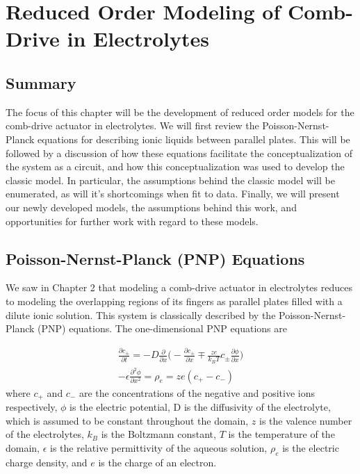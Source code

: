 \chapter{Reduced Order Modeling of Comb-Drive in Electrolytes}

\ifpdf
    \graphicspath{{Chapter3/Figs/Raster/}{Chapter3/Figs/PDF/}{Chapter3/Figs/}}
\else
    \graphicspath{{Chapter3/Figs/Vector/}{Chapter3/Figs/}}
\fi

\section{Summary}
The focus of this chapter will be the development of reduced order models for the comb-drive actuator in electrolytes. We will first review the Poisson-Nernst-Planck equations for describing ionic liquids between parallel plates. This will be followed by a discussion of how these equations facilitate the conceptualization of the system as a circuit, and how this conceptualization was used to develop the classic model. In particular, the assumptions behind the classic model will be enumerated, as will it's shortcomings when fit to data. Finally, we will present our newly developed models, the assumptions behind this work, and opportunities for further work with regard to these models. 

\section{Poisson-Nernst-Planck (PNP) Equations}
We saw in Chapter 2 that modeling a comb-drive actuator in electrolytes reduces to modeling the overlapping regions of its fingers as parallel plates filled with a dilute ionic solution. This system is classically described by the Poisson-Nernst-Planck (PNP) equations. The one-dimensional PNP equations are

\begin{align}
    \frac{\partial c_\pm}{\partial t} = - D\frac{\partial}{\partial x}\bigg(-\frac{\partial c_\pm}{\partial x} \mp  \frac{ze}{k_B T}c_\pm \frac{\partial \phi}{\partial x}\bigg) \label{pnp_equations_1} \\
    -\epsilon \frac{\partial^2 \phi}{\partial x^2} = \rho_e = ze(c_+ - c_-) \label{pnp_equations_2} 
\end{align}
where $c_+$ and $c_-$ are the concentrations of the negative and positive ions respectively, $\phi$ is the electric potential, D is the diffusivity of the electrolyte, which is assumed to be constant throughout the domain, $z$ is the valence number of the electrolytes, $k_B$ is the Boltzmann constant, $T$ is the temperature of the domain, $\epsilon$ is the relative permittivity of the aqueous solution, $\rho_e$ is the electric charge density, and $e$ is the charge of an electron.

